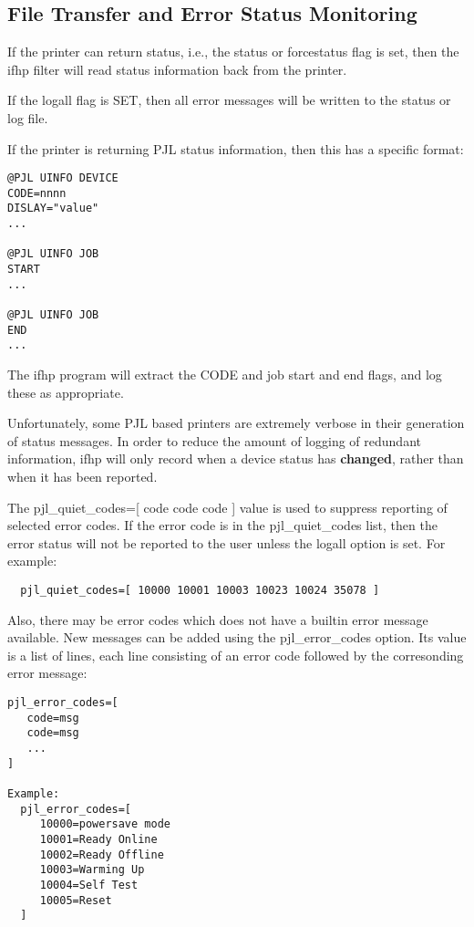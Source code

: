 \documentclass[a4paper]{article}
\begin{document}
\subsection{File Transfer and Error Status Monitoring
\label{filetransfer}
\label{logall}
\label{pjl_error_codes}
\label{pjl_quiet_codes}}

If the printer can return status, i.e., the
{\ttfamily status}
or 
{\ttfamily forcestatus}
flag is set,
then the
{\ttfamily ifhp}
filter will read status information back from the printer.

If the
{\ttfamily logall}
flag is SET,
then all error messages will be written to the status or log file.

If the printer is returning PJL status information,
then this has a specific format:
\begin{tscreen}
\begin{verbatim}
@PJL UINFO DEVICE
CODE=nnnn
DISLAY="value"
...

@PJL UINFO JOB
START
...

@PJL UINFO JOB
END
...
\end{verbatim}
\end{tscreen}


The
{\ttfamily ifhp} program will extract the
{\ttfamily CODE}
and job start and end flags,
and log these as appropriate.

Unfortunately,
some PJL based printers are extremely verbose in their generation of status
messages.
In order to reduce the amount of logging of redundant information,
{\ttfamily ifhp}
will only record when a device status has
{\bfseries changed},
rather than when it has been reported.

The
pjl\_quiet\_codes={[} code code code {]}
value is used to suppress reporting of selected error codes.
If the error code is in the pjl\_quiet\_codes list,  then the error status
will not be reported to the user unless the
{\ttfamily logall}
option is set.
For example:
\begin{tscreen}
\begin{verbatim}
  pjl_quiet_codes=[ 10000 10001 10003 10023 10024 35078 ]
\end{verbatim}
\end{tscreen}


Also, there may be error codes which does not have a builtin error
message available.  New messages can be added using the
{\ttfamily pjl\_error\_codes}
option.
Its value is a list of lines, each line consisting of an error code
followed by the corresonding error message:
\begin{tscreen}
\begin{verbatim}
pjl_error_codes=[
   code=msg
   code=msg
   ...
]

Example:
  pjl_error_codes=[
     10000=powersave mode
     10001=Ready Online
     10002=Ready Offline
     10003=Warming Up
     10004=Self Test
     10005=Reset
  ]
\end{verbatim}
\end{tscreen}
\end{document}
